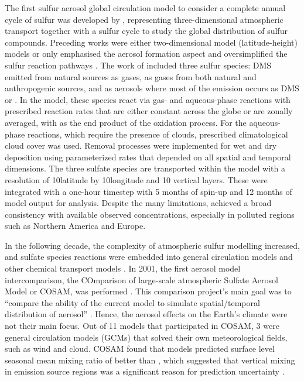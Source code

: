 The first sulfur aerosol global circulation model to consider a complete annual cycle of sulfur was developed by \citet{langnerGlobalThreedimensionalModel1991}, representing three-dimensional atmospheric transport together with a sulfur cycle to study the global distribution of sulfur compounds. Preceding works were either two-dimensional model (latitude-height) models \citep{rodheGlobalDistributionSulfur1980} or only emphasised the aerosol formation aspect and oversimplified the sulfur reaction pathways \citep{ericksoniiiGlobalOceantoatmosphereDimethyl1990}. The work of \citet{langnerGlobalThreedimensionalModel1991} included three sulfur species: DMS emitted from natural sources as gases,  as gases from both natural and anthropogenic sources, and  as aerosols where most of the emission occurs as DMS or . In the model, these species react via gas- and aqueous-phase reactions with prescribed reaction rates that are either constant across the globe or are zonally averaged, with  as the end product of the oxidation process. For the aqueous-phase reactions, which require the presence of clouds, prescribed climatological cloud cover was used. Removal processes were implemented for wet and dry deposition using parameterized rates that depended on all spatial and temporal dimensions. The three sulfate species are transported within the model with a resolution of 10\textdegree latitude by 10\textdegree longitude and 10 vertical layers. These were integrated with a one-hour timestep with 5 months of spin-up and 12 months of model output for analysis. Despite the many limitations, \citet{langnerGlobalThreedimensionalModel1991} achieved a broad consistency with available observed concentrations, especially in polluted regions such as Northern America and Europe.

In the following decade, the complexity of atmospheric sulfur modelling increased, and sulfate species reactions were embedded into general circulation models and other chemical transport models \citep[e.g.][]{kochTroposphericSulfurSimulation1999}.  In 2001, the first aerosol model intercomparison, the COmparison of large-scale atmospheric Sulfate Aerosol Model or COSAM, was performed  \citep{barrieComparisonLargescaleAtmospheric2001, lohmannVerticalDistributionsSulfur2001, roelofsAnalysisRegionalBudgets2001}. This comparison project’s main goal was to “compare the ability of the current model to simulate spatial/temporal distribution of aerosol” \citep{barrieComparisonLargescaleAtmospheric2001}. Hence, the aerosol effects on the Earth’s climate were not their main focus.  Out of 11 models that participated in COSAM, 3 were general circulation models (GCMs) that solved their own meteorological fields, such as wind and cloud. COSAM found that models predicted surface level seasonal mean mixing ratio of  better than , which suggested that vertical mixing in emission source regions was a significant reason for prediction uncertainty \citep{lohmannVerticalDistributionsSulfur2001}. 

